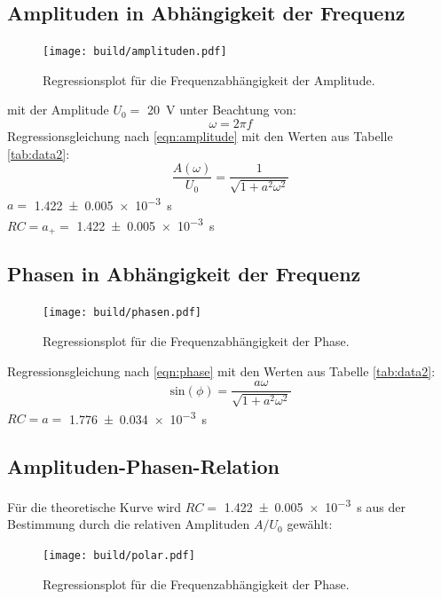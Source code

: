 \subsection{Amplituden in Abhängigkeit der Frequenz}

\begin{figure}[H]
  \centering
  \texttt{[image: build/amplituden.pdf]}
  \caption{Regressionsplot für die Frequenzabhängigkeit der Amplitude.}
  \label{fig:amp_plot}
\end{figure}
mit der Amplitude $U_0=$ \SI{20}{\volt}
unter Beachtung von:
\begin{equation}
  \omega = 2\pi f
\end{equation}
Regressionsgleichung nach \eqref{eqn:amplitude}
mit den Werten aus Tabelle \ref{tab:data2}:
\begin{equation}
  \frac{A(\omega)}{U_0}=\frac{1}{\sqrt{1+a^2\omega^2}}
\end{equation}
$a=$ \pm\SI{1.422(5)e-3}{\second}\\
$RC=a_+=$ \SI{1.422(5)e-3}{\second}

\subsection{Phasen in Abhängigkeit der Frequenz}

\begin{figure}[H]
  \centering
  \texttt{[image: build/phasen.pdf]}
  \caption{Regressionsplot für die Frequenzabhängigkeit der Phase.}
  \label{fig:ph_plot}
\end{figure}

Regressionsgleichung nach \eqref{eqn:phase}
mit den Werten aus Tabelle \ref{tab:data2}:
\begin{equation}
  \text{sin}(\phi)=\frac{a\omega}{\sqrt{1+a^2\omega^2}}
\end{equation}
$RC=a=$ \SI{1.776(34)e-3}{\second}\\

\subsection{Amplituden-Phasen-Relation}
Für die theoretische Kurve wird $RC=$ \SI{1.422(5)e-3}{\second} aus der Bestimmung durch die relativen
Amplituden $A/U_0$ gewählt:
\begin{figure}[H]
  \centering
  \texttt{[image: build/polar.pdf]}
  \caption{Regressionsplot für die Frequenzabhängigkeit der Phase.}
  \label{fig:pol_plot}
\end{figure}


